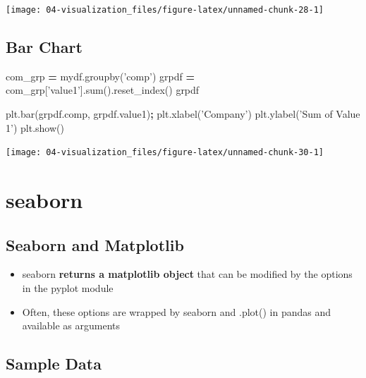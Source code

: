 \documentclass[
]{book}
\newenvironment{Shaded}{\begin{snugshade}}{\end{snugshade}}
\newcommand{\BuiltInTok}[1]{#1}
\newcommand{\NormalTok}[1]{#1}
\newcommand{\OperatorTok}[1]{\textcolor[rgb]{0.43,0.43,0.43}{\textbf{#1}}}
\newcommand{\StringTok}[1]{\textcolor[rgb]{0.5,0.5,0.5}{#1}}
\providecommand{\tightlist}{%
  \setlength{\itemsep}{0pt}\setlength{\parskip}{0pt}}
\begin{document}
\texttt{[image: 04-visualization\_files/figure-latex/unnamed-chunk-28-1]}

\hypertarget{bar-chart}{%
\section{Bar Chart}\label{bar-chart}}

\begin{Shaded}
\begin{Highlighting}[]
\NormalTok{com_grp }\OperatorTok{=}\NormalTok{ mydf.groupby(}\StringTok{'comp'}\NormalTok{)}
\NormalTok{grpdf }\OperatorTok{=}\NormalTok{ com_grp[}\StringTok{'value1'}\NormalTok{].}\BuiltInTok{sum}\NormalTok{().reset_index()}
\NormalTok{grpdf}
\end{Highlighting}
\end{Shaded}

\begin{Shaded}
\begin{Highlighting}[]
\NormalTok{plt.bar(grpdf.comp, grpdf.value1)}\OperatorTok{;}
\NormalTok{plt.xlabel(}\StringTok{'Company'}\NormalTok{)}
\NormalTok{plt.ylabel(}\StringTok{'Sum of Value 1'}\NormalTok{)}
\NormalTok{plt.show()}
\end{Highlighting}
\end{Shaded}

\texttt{[image: 04-visualization\_files/figure-latex/unnamed-chunk-30-1]}

\hypertarget{seaborn}{%
\chapter{seaborn}\label{seaborn}}

\hypertarget{seaborn-and-matplotlib}{%
\section{Seaborn and Matplotlib}\label{seaborn-and-matplotlib}}

\begin{itemize}
\tightlist
\item
  seaborn \textbf{returns a matplotlib object} that can be modified by the options in the pyplot module\\
\item
  Often, these options are wrapped by seaborn and .plot() in pandas and available as arguments
\end{itemize}

\hypertarget{sample-data-19}{%
\section{Sample Data}\label{sample-data-19}}
\end{document}
